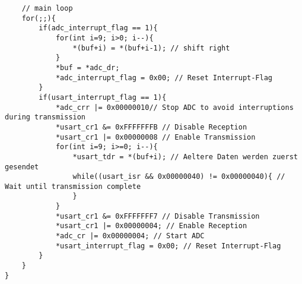 \documentclass[11pt]{report}
\begin{document}
\begin{lstlisting}
	// main loop
	for(;;){
		if(adc_interrupt_flag == 1){
			for(int i=9; i>0; i--){
				*(buf+i) = *(buf+i-1); // shift right
			}
			*buf = *adc_dr;
			*adc_interrupt_flag = 0x00; // Reset Interrupt-Flag
		}
		if(usart_interrupt_flag == 1){
			*adc_crr |= 0x00000010// Stop ADC to avoid interruptions during transmission
			*usart_cr1 &= 0xFFFFFFFB // Disable Reception
			*usart_cr1 |= 0x00000008 // Enable Transmission
			for(int i=9; i>=0; i--){
				*usart_tdr = *(buf+i); // Aeltere Daten werden zuerst gesendet
				while((usart_isr && 0x00000040) != 0x00000040){ // Wait until transmission complete
				}
			}
			*usart_cr1 &= 0xFFFFFFF7 // Disable Transmission
			*usart_cr1 |= 0x00000004; // Enable Reception
			*adc_cr |= 0x00000004; // Start ADC
			*usart_interrupt_flag = 0x00; // Reset Interrupt-Flag
		}
	}
}
	\end{lstlisting}
\end{document}
